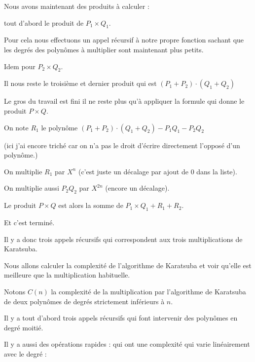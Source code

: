 \change

Nous avons maintenant des produits à calculer : 


tout d'abord le produit de $P_1 \times Q_1$.

Pour cela nous effectuons un appel récursif à notre propre fonction sachant que les degrés
des polynômes à multiplier sont maintenant plus petits.

Idem pour $P_2 \times Q_2$.

\change


Il nous reste le troisième et dernier produit qui est $(P_1 + P_2 ) \cdot (Q_1 + Q_2 )$


\change

Le gros du travail est fini il ne reste plus qu'à 
appliquer la formule qui donne le produit $P \times Q$.

On note $R_1$ le polynôme $(P_1 + P_2 ) \cdot (Q_1 + Q_2 ) - P_1 Q_1 - P_2 Q_2$

(ici j'ai encore triché car on n'a pas le droit d'écrire directement l'opposé d'un polynôme.)

\change

On multiplie $R_1$ par $X^n$ (c'est juste un décalage par ajout de $0$ dans la liste).

\change

On multiplie aussi $P_2Q_2$ par $X^{2n}$ (encore un décalage).

\change

Le produit $P\times Q$ est alors la somme de $P_1\times Q_1 + R_1 + R_2$.

Et c'est terminé.

Il y a donc trois appels récursifs qui correspondent aux trois multiplications de Karatsuba.

\diapo

Nous allons calculer la complexité de l'algorithme de Karatsuba et 
voir qu'elle est meilleure que la multiplication habituelle.



Notons $C(n)$ la complexité de la multiplication par l'algorithme de Karatsuba de 
deux polynômes de degrés strictement inférieurs à $n$. 

\change

 Il y a tout d'abord trois appels récursifs qui font intervenir des polynômes en degré moitié.
 
\change

Il y a aussi des opérations rapides : qui ont une complexité qui varie linéairement avec le degré :

